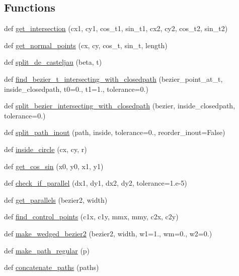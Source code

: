 \subsection*{Functions}
\begin{DoxyCompactItemize}
\item 
def \hyperlink{namespacematplotlib_1_1bezier_a6f3e6a2fff0ee2c27bf2dc87fdc511c7}{get\+\_\+intersection} (cx1, cy1, cos\+\_\+t1, sin\+\_\+t1, cx2, cy2, cos\+\_\+t2, sin\+\_\+t2)
\item 
def \hyperlink{namespacematplotlib_1_1bezier_a83750c875dd90814c60ff780e32224de}{get\+\_\+normal\+\_\+points} (cx, cy, cos\+\_\+t, sin\+\_\+t, length)
\item 
def \hyperlink{namespacematplotlib_1_1bezier_a39eaa29c167901ce43a1e03ff3397d36}{split\+\_\+de\+\_\+casteljau} (beta, t)
\item 
def \hyperlink{namespacematplotlib_1_1bezier_a9077f52d0ef522b7490a79c9075863d9}{find\+\_\+bezier\+\_\+t\+\_\+intersecting\+\_\+with\+\_\+closedpath} (bezier\+\_\+point\+\_\+at\+\_\+t, inside\+\_\+closedpath, t0=0., t1=1., tolerance=0.)
\item 
def \hyperlink{namespacematplotlib_1_1bezier_a476a969792273227a0918f06955857a4}{split\+\_\+bezier\+\_\+intersecting\+\_\+with\+\_\+closedpath} (bezier, inside\+\_\+closedpath, tolerance=0.)
\item 
def \hyperlink{namespacematplotlib_1_1bezier_aa1e31992c932224101ec7a160cd79c3b}{split\+\_\+path\+\_\+inout} (path, inside, tolerance=0., reorder\+\_\+inout=False)
\item 
def \hyperlink{namespacematplotlib_1_1bezier_a821fdbdadfd91bc2c65943bd0e825a93}{inside\+\_\+circle} (cx, cy, r)
\item 
def \hyperlink{namespacematplotlib_1_1bezier_affd32e87924de16dc65b98416ade9ae7}{get\+\_\+cos\+\_\+sin} (x0, y0, x1, y1)
\item 
def \hyperlink{namespacematplotlib_1_1bezier_a632097a44132aa1f6b5f71ea60a74495}{check\+\_\+if\+\_\+parallel} (dx1, dy1, dx2, dy2, tolerance=1.e-\/5)
\item 
def \hyperlink{namespacematplotlib_1_1bezier_adb87525c6baca583ac76341c2cc20308}{get\+\_\+parallels} (bezier2, width)
\item 
def \hyperlink{namespacematplotlib_1_1bezier_a384fd769c4cd4e1ca978fda42441ad24}{find\+\_\+control\+\_\+points} (c1x, c1y, mmx, mmy, c2x, c2y)
\item 
def \hyperlink{namespacematplotlib_1_1bezier_a8a1dac2d69f980a2facceedfa1a32cee}{make\+\_\+wedged\+\_\+bezier2} (bezier2, width, w1=1., wm=0., w2=0.)
\item 
def \hyperlink{namespacematplotlib_1_1bezier_a0c03d7bf08d07e6d6f17e5c2d67a5875}{make\+\_\+path\+\_\+regular} (p)
\item 
def \hyperlink{namespacematplotlib_1_1bezier_ad94e57c5dc18ec3824e768991f20a635}{concatenate\+\_\+paths} (paths)
\end{DoxyCompactItemize}
